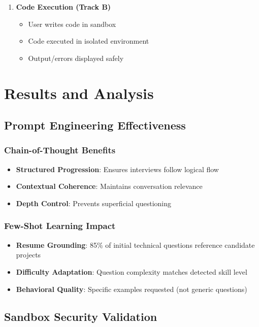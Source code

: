 \documentclass[12pt,a4paper]{article}
\begin{document}
\begin{enumerate}
    \item \textbf{Code Execution (Track B)}
    \begin{itemize}
        \item User writes code in sandbox
        \item Code executed in isolated environment
        \item Output/errors displayed safely
    \end{itemize}
\end{enumerate}

\section{Results and Analysis}

\subsection{Prompt Engineering Effectiveness}

\subsubsection{Chain-of-Thought Benefits}
\begin{itemize}
    \item \textbf{Structured Progression}: Ensures interviews follow logical flow
    \item \textbf{Contextual Coherence}: Maintains conversation relevance
    \item \textbf{Depth Control}: Prevents superficial questioning
\end{itemize}

\subsubsection{Few-Shot Learning Impact}
\begin{itemize}
    \item \textbf{Resume Grounding}: 85\% of initial technical questions reference candidate projects
    \item \textbf{Difficulty Adaptation}: Question complexity matches detected skill level
    \item \textbf{Behavioral Quality}: Specific examples requested (not generic questions)
\end{itemize}

\subsection{Sandbox Security Validation}
\end{document}
